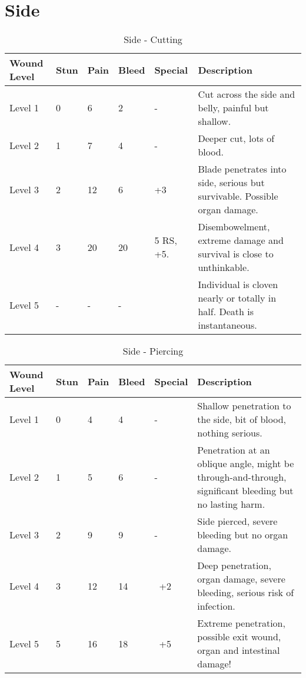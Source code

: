\documentclass[oneside,11pt,english]{book}
\begin{document}
\section{Side} \vspace{-25pt} \label{sec:side}
\begin{table}[hb] %
	\caption{Side - Cutting}
	\label{wound:Side - Cutting}
	\begin{tabu} to 
Wound Level &Stun &Pain &Bleed &Special &Description\\\toprule
Level 1& 0& 6& 2& - &Cut across the side and belly, painful but shallow.\\
Level 2& 1& 7& 4& - &Deeper cut, lots of blood.\\
Level 3& 2& 12& 6&  +3 &Blade penetrates into side, serious but survivable. Possible organ damage.\\
Level 4& 3& 20& 20
	& 5 RS,
		 +5.
	&Disembowelment, extreme damage and survival is close to unthinkable.\\
Level 5& - &- &- && Individual is cloven nearly or totally in half. Death is instantaneous.\\
	\end{tabu}
\end{table}

\begin{table}[hb] %
	\caption{Side - Piercing}
	\label{wound:Side - Piercing}
	\begin{tabu} to 
Wound Level &Stun &Pain &Bleed &Special &Description\\\toprule
Level 1& 0& 4& 4& - &Shallow penetration to the side, bit of blood, nothing serious.\\
Level 2& 1& 5& 6& - &Penetration at an oblique angle, might be through-and-through, significant bleeding but no lasting harm.\\
Level 3& 2& 9& 9& - &Side pierced, severe bleeding but no organ damage.\\
Level 4& 3& 12& 14& ~+2& Deep penetration, organ damage, severe bleeding, serious risk of infection. \\
Level 5& 5& 16& 18& ~+5& Extreme penetration, possible exit wound, organ and intestinal damage!\\
	\end{tabu}
\end{table}
\end{document}
